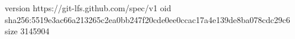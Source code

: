 version https://git-lfs.github.com/spec/v1
oid sha256:5519e3ac66a213265c2ea0bb247f20cde0ee0ccac17a4e139de8ba078cdc29c6
size 3145904
